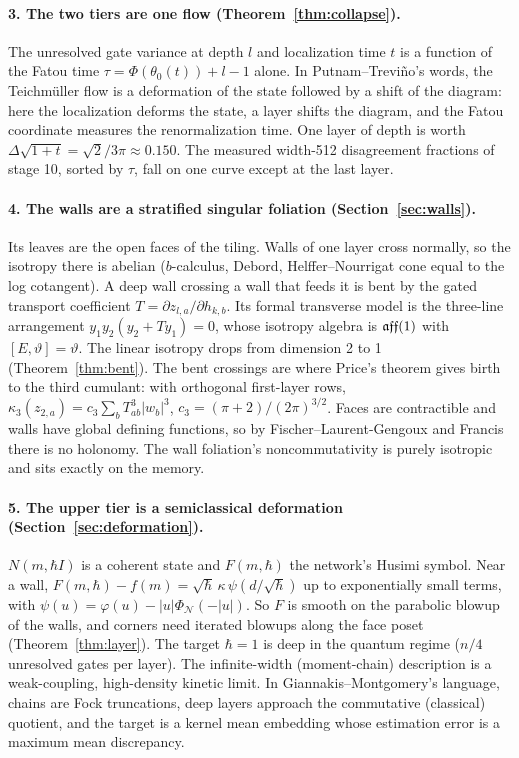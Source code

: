 \paragraph{3. The two tiers are one flow (Theorem~\ref{thm:collapse}).} The unresolved gate variance at depth $l$ and localization time
$t$ is a function of the Fatou time $\tau=\Phi(\theta_0(t))+l-1$ alone. In Putnam--Trevi\~no's words, the Teichm\"uller flow is a
deformation of the state followed by a shift of the diagram: here the localization deforms the state, a layer shifts the diagram, and
the Fatou coordinate measures the renormalization time. One layer of depth is worth $\Delta\sqrt{1+t}=\sqrt2/3\pi\approx0.150$. The
measured width-512 disagreement fractions of stage 10, sorted by $\tau$, fall on one curve except at the last layer.

\paragraph{4. The walls are a stratified singular foliation (Section~\ref{sec:walls}).} Its leaves are the open faces of the tiling. Walls
of one layer cross normally, so the isotropy there is abelian ($b$-calculus, Debord, Helffer--Nourrigat cone equal to the log
cotangent). A deep wall crossing a wall that feeds it is bent by the gated transport coefficient $T=\partial z_{l,a}/\partial h_{k,b}$.
Its formal transverse model is the three-line arrangement $y_1y_2(y_2+Ty_1)=0$, whose isotropy algebra is $\mathfrak{aff}(1)$ with
$[E,\vartheta]=\vartheta$. The linear isotropy drops from dimension 2 to 1 (Theorem~\ref{thm:bent}). The bent crossings are where Price's theorem gives birth to the third cumulant: with
orthogonal first-layer rows, $\kappa_3(z_{2,a})=c_3\sum_bT_{ab}^3|w_b|^3$, $c_3=(\pi+2)/(2\pi)^{3/2}$. Faces are contractible and walls
have global defining functions, so by Fischer--Laurent-Gengoux and Francis there is no holonomy. The wall foliation's
noncommutativity is purely isotropic and sits exactly on the memory.

\paragraph{5. The upper tier is a semiclassical deformation (Section~\ref{sec:deformation}).} $N(m,\hbar I)$ is a coherent state and
$F(m,\hbar)$ the network's Husimi symbol. Near a wall, $F(m,\hbar)-f(m)=\sqrt\hbar\,\kappa\,\psi(d/\sqrt\hbar)$ up to exponentially small
terms, with $\psi(u)=\varphi(u)-|u|\Phi_{\mathcal N}(-|u|)$. So $F$ is smooth on the parabolic blowup of the walls, and corners need
iterated blowups along the face poset (Theorem~\ref{thm:layer}). The target $\hbar=1$ is deep in the quantum regime ($n/4$ unresolved gates
per layer). The infinite-width (moment-chain) description is a weak-coupling, high-density kinetic limit. In Giannakis--Montgomery's
language, chains are Fock truncations, deep layers approach the commutative (classical) quotient, and the target is a kernel mean
embedding whose estimation error is a maximum mean discrepancy.

